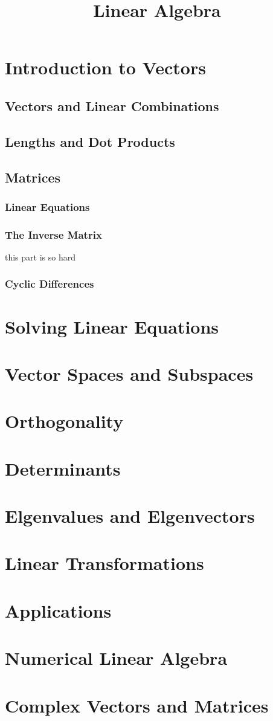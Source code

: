\documentclass{book}
\begin{document}
\tableofcontents

\title{Linear Algebra}

\chapter{Introduction to Vectors}

\section{Vectors and Linear Combinations}
\section{Lengths and Dot Products}
\section{Matrices}
\subsection{Linear Equations}
\subsection{The Inverse Matrix}
this part is so hard

\subsection{Cyclic Differences}

\chapter{Solving Linear Equations}

\chapter{Vector Spaces and Subspaces}

\chapter{Orthogonality}

\chapter{Determinants}

\chapter{Elgenvalues and Elgenvectors}

\chapter{Linear Transformations}

\chapter{Applications}

\chapter{Numerical Linear Algebra}

\chapter{Complex Vectors and Matrices}
\end{document}
